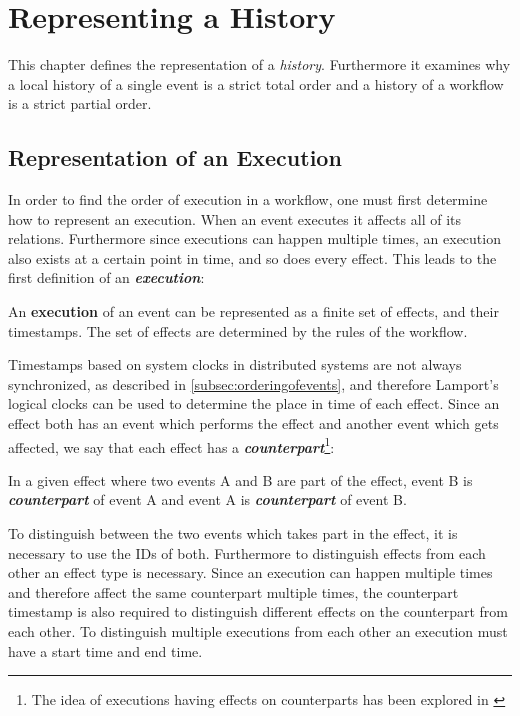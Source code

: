 \chapter{Representing a History}\label{chap:representing-a-history}
	This chapter defines the representation of a \textit{history}. Furthermore it examines why a local history of a single event is a strict total order and a history of a workflow is a strict partial order.
	
    \section{Representation of an Execution}\label{sec:rep:exec}
    In order to find the order of execution in a workflow, one must first determine how to represent an execution. When an event executes it affects all of its relations. Furthermore since executions can happen multiple times, an execution also exists at a certain point in time, and so does every effect. This leads to the first definition of an \textbf{\textit{execution}}:
	
	\begin{definition}
		An \textbf{execution} of an event can be represented as a finite set of effects, and their timestamps. The set of effects are determined by the rules of the workflow.
	\end{definition}
	
	\noindent Timestamps based on system clocks in distributed systems are not always synchronized, as described in \autoref{subsec:orderingofevents}, and therefore Lamport's logical clocks can be used to determine the place in time of each effect. Since an effect both has an event which performs the effect and another event which gets affected, we say that each effect has a \textbf{\textit{counterpart}}\footnote{The idea of executions having effects on counterparts has been explored in \cite{debois2015safety}}:
	
	\begin{definition}
		In a given effect where two events A and B are part of the effect, event B is \textbf{\textit{counterpart}} of event A and event A is \textbf{\textit{counterpart}} of event B.
	\end{definition}
	
	\noindent To distinguish between the two events which takes part in the effect, it is necessary to use the IDs of both. Furthermore to distinguish effects from each other an effect type is necessary. Since an execution can happen multiple times and therefore affect the same counterpart multiple times, the counterpart timestamp is also required to distinguish different effects on the counterpart from each other. To distinguish multiple executions from each other an execution must have a start time and end time.
	
